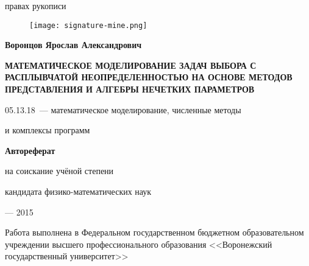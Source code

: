 \newcommand{\sfs}{\fontsize{14pt}{15pt}\selectfont}
\sfs %
\thispagestyle{empty}

\vspace{5mm}
\begin{flushright}
   правах рукописи
\end{flushright}

\begin{figure}[h!] 
\begin{flushright}
  \texttt{[image: signature-mine.png]}
\end{flushright}
\end{figure}

\vspace{5mm}
\begin{center}
{\Large\bf Воронцов Ярослав Александрович}
\end{center}

\vspace{15mm}
\begin{center}
{\bf \LARGE \MakeUppercase {Математическое моделирование задач выбора с расплывчатой неопределенностью на основе методов представления и алгебры нечетких параметров}
\par}

\vspace{20mm}
{\Large
05.13.18~--- математическое моделирование, численные методы\par и комплексы программ
}

\vspace{15mm}
\textbf{Автореферат}\par
{} на соискание учёной степени\par
кандидата физико-математических наук
\end{center}

\vspace{40mm}
\begin{center}
{ --- 2015}
\end{center}

\newpage
\thispagestyle{empty}
\noindent Работа выполнена в Федеральном государственном бюджетном образовательном учреждении высшего профессионального образования <<Воронежский государственный университет>>

\vspace{10mm}

